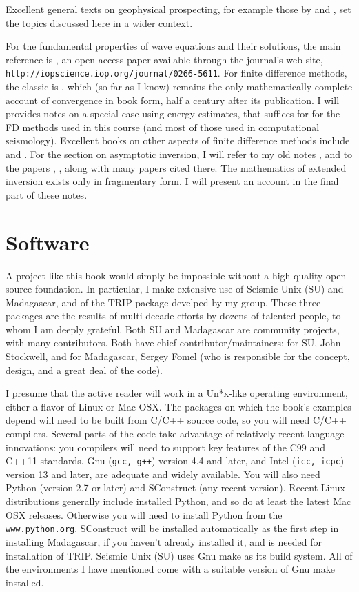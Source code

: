 Excellent general texts on geophysical prospecting, for example those by \cite{Yil:01} and \cite{DobSav:88}, set the topics discussed here in a wider context. 

For the fundamental properties of wave equations and their solutions, the main reference is \cite{BlazekStolkSymes:13}, an open access paper available through the journal's web site, {\tt http://iopscience.iop.org/journal/0266-5611}. For finite difference methods, the classic is \cite{RichtMort}, which (so far as I know) remains the only mathematically complete account of convergence in book form, half a century after its publication. I will provides notes on a special case using energy estimates, that suffices for for the FD methods used in this course (and most of those used in computational seismology). Excellent books on other aspects of finite difference methods include \cite{Cohen:01} and \cite{Leveque:07}. For the section on asymptotic inversion, I will refer to my old notes \cite[]{SymesNotes}, and to the papers \cite[]{HouSymes:15}, \cite[]{HouSymes:17}, along with many papers cited there. The mathematics of extended inversion exists only in fragmentary form. I will present an account in the final part of these notes.

\section{Software} 
A project like this book would simply be impossible without a high quality open source foundation. In particular, I make extensive use of Seismic Unix (SU) and Madagascar, and of the TRIP package develped by my group. These three packages are the results of multi-decade efforts by dozens of talented people, to whom I am deeply grateful. Both SU and Madagascar are community projects, with many contributors. Both have chief contributor/maintainers: for SU, John Stockwell, and for Madagascar, Sergey Fomel (who is responsible for the concept, design, and a great deal of the code).

I presume that the active reader will work in a Un*x-like operating environment, either a flavor of Linux or Mac OSX. The packages on which the book's examples depend will need to be built from C/C++ source code, so you will need C/C++ compilers. Several parts of the code take advantage of relatively recent language innovations: you compilers will need to support key features of the C99 and C++11 standards. Gnu ({\tt gcc, g++}) version 4.4 and later, and Intel ({\tt icc, icpc}) version 13 and later, are adequate and widely available. You will also need Python (version 2.7 or later) and SConstruct (any recent version). Recent Linux distributions generally include installed Python, and so do at least the latest Mac OSX releases. Otherwise you will need to install Python from the {\tt www.python.org}. SConstruct will be installed automatically as the first step in installing Madagascar, if you haven't already installed it, and is needed for installation of TRIP. Seismic Unix (SU) uses Gnu make as its build system. All of the environments I have mentioned come with a suitable version of Gnu make installed.

